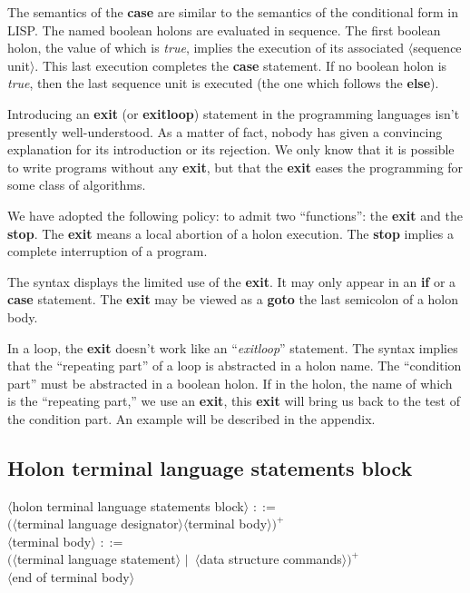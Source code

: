 \documentclass[openany,nobib]{tufte-book}
\newcommand{\kw}[1]{{\bf #1}}
\newcommand{\sym}[1]{$\langle$#1$\rangle$}
\def\is{$::=$\ }
\def\alt{$|$\ }
\begin{document}
The semantics of the \kw{case} are similar to the semantics of the conditional
form in LISP. The named boolean holons are evaluated in sequence. The first
boolean holon, the value of which is {\it true}, implies the execution of its
associated \sym{sequence unit}. This last execution completes the \kw{case}
statement. If no boolean holon is {\sl true}, then the last sequence unit is
executed (the one which follows the \kw{else}).

Introducing an \kw{exit} (or \kw{exitloop}) statement in the programming
languages isn't presently well-understood. As a matter of fact, nobody has
given a convincing explanation for its introduction or its rejection. We only
know that it is possible to write programs without any \kw{exit}, but that the
\kw{exit} eases the programming for some class of algorithms.

We have adopted the following policy: to admit two ``functions'': the \kw{exit}
and the \kw{stop}. The \kw{exit} means a local abortion of a holon
execution. The \kw{stop} implies a complete interruption of a program.

The syntax displays the limited use of the \kw{exit}. It may only appear in an
\kw{if} or a \kw{case} statement. The \kw{exit} may be viewed as a \kw{goto}
the last semicolon of a holon body.

In a loop, the \kw{exit} doesn't work like an ``{\sl exitloop}'' statement.
The syntax implies that the ``repeating part'' of a loop is abstracted in a
holon name. The ``condition part'' must be abstracted in a boolean holon. If in
the holon, the name of which is the ``repeating part,'' we use an \kw{exit},
this \kw{exit} will bring us back to the test of the condition part. An
example will be described in the appendix.

\subsection{Holon terminal language statements block}

\begin{tcolorbox}
\sym{holon terminal language statements block} \is \\
\qquad$($\sym{terminal language designator}\sym{terminal body}$)^+$\\
\sym{terminal body} \is \\
\qquad$($\sym{terminal language statement} \alt \sym{data structure
commands}$)^+$\\
\qquad\qquad\sym{end of terminal body}
\end{tcolorbox}
\end{document}
